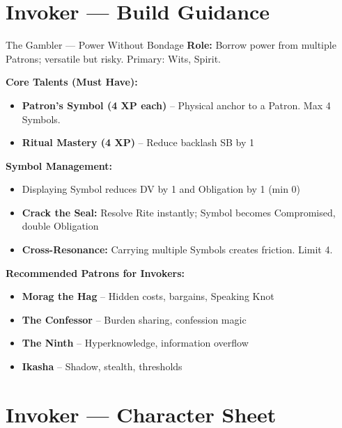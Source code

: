 \documentclass[10pt]{article}
\begin{document}
\newpage


\section*{Invoker --- Build Guidance}

\begin{tipbox}{The Gambler --- Power Without Bondage}
    \textbf{Role:} Borrow power from multiple Patrons; versatile but risky. Primary: Wits, Spirit.
    
    \textbf{Core Talents (Must Have):}
    \begin{itemize}
        \item \textbf{Patron's Symbol (4 XP each)} -- Physical anchor to a Patron. Max 4 Symbols.
        \item \textbf{Ritual Mastery (4 XP)} -- Reduce backlash SB by 1
    \end{itemize}
    
    \textbf{Symbol Management:}
    \begin{itemize}
        \item Displaying Symbol reduces DV by 1 and Obligation by 1 (min 0)
        \item \textbf{Crack the Seal:} Resolve Rite instantly; Symbol becomes Compromised, double Obligation
        \item \textbf{Cross-Resonance:} Carrying multiple Symbols creates friction. Limit 4.
    \end{itemize}
    
    \textbf{Recommended Patrons for Invokers:}
    \begin{itemize}
        \item \textbf{Morag the Hag} -- Hidden costs, bargains, Speaking Knot
        \item \textbf{The Confessor} -- Burden sharing, confession magic
        \item \textbf{The Ninth} -- Hyperknowledge, information overflow
        \item \textbf{Ikasha} -- Shadow, stealth, thresholds
    \end{itemize}
\end{tipbox}

\newpage

\section*{Invoker --- Character Sheet}
\end{document}

